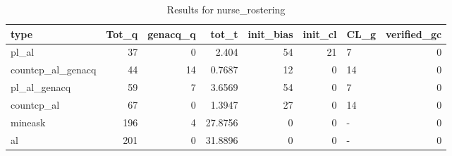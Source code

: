 \begin{table}[ht]
\caption{Results for nurse_rostering}
\begin{tabular}{lrrrrrlr}
\hline
 type              &   Tot\_q &   genacq\_q &   tot\_t &   init\_bias &   init\_cl & CL\_g   &   verified\_gc \\
\hline
 pl\_al             &      37 &          0 &  2.404  &          54 &        21 & 7      &             0 \\
 countcp\_al\_genacq &      44 &         14 &  0.7687 &          12 &         0 & 14     &             0 \\
 pl\_al\_genacq      &      59 &          7 &  3.6569 &          54 &         0 & 7      &             0 \\
 countcp\_al        &      67 &          0 &  1.3947 &          27 &         0 & 14     &             0 \\
 mineask           &     196 &          4 & 27.8756 &           0 &         0 & -      &             0 \\
 al                &     201 &          0 & 31.8896 &           0 &         0 & -      &             0 \\
\hline
\end{tabular}
\end{table}